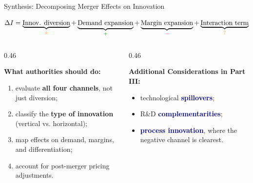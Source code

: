 \documentclass[10pt, aspectratio=169]{beamer}
\newcommand{\highlight}[1]{\textcolor{darkblue}{\textbf{#1}}}
\begin{document}
\begin{frame}{Synthesis: Decomposing Merger Effects on Innovation}
\small

\begin{center}
\footnotesize
$
\Delta I = 
\underbrace{\text{Innov. diversion}}_{\textcolor{orange!80}{\pm}} +
\underbrace{\text{Demand expansion}}_{\textcolor{green!60!black}{+}} +
\underbrace{\text{Margin expansion}}_{\textcolor{red!70}{-}} +
\underbrace{\text{Interaction term}}_{\textcolor{orange!80}{?}}
$
\end{center}

\vspace{0.8em}
\begin{columns}[T,onlytextwidth]
\begin{column}{0.46\textwidth}

\textbf{What authorities should do:}
\begin{enumerate}
  \item evaluate \textbf{all four channels}, not just diversion;
  \item classify the \textbf{type of innovation} (vertical vs. horizontal);
  \item map effects on demand, margins, and differentiation;
  \item account for post-merger pricing adjustments.
\end{enumerate}

\end{column}
\begin{column}{0.46\textwidth}

\textbf{Additional Considerations in Part III:}
\begin{itemize}
  \item technological \highlight{spillovers};
  \item R\&D \highlight{complementarities};
  \item \highlight{process innovation}, where the negative channel is clearest.
\end{itemize}

\end{column}
\end{columns}

\vspace{0.9em}
\centering
{}
\end{frame}
\end{document}
